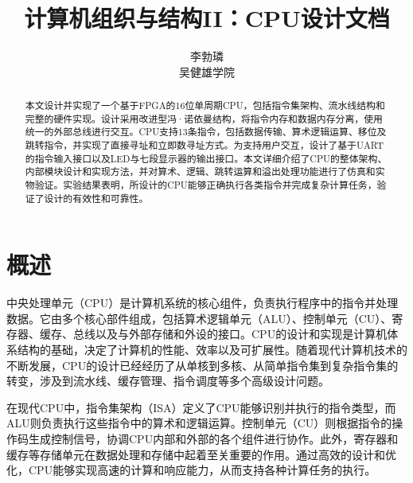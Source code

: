 \documentclass[lang=cn,a4paper,newtx]{elegantpaper}
\title{计算机组织与结构II：CPU设计文档}
\author{李勃璘 \\ 吴健雄学院}
\date{\zhdate{2025/5/6}}
\begin{document}
\maketitle
\thispagestyle{empty}
\begin{abstract}
  本文设计并实现了一个基于FPGA的16位单周期CPU，包括指令集架构、流水线结构和完整的硬件实现。设计采用改进型冯·诺依曼结构，将指令内存和数据内存分离，使用统一的外部总线进行交互。CPU支持13条指令，包括数据传输、算术逻辑运算、移位及跳转指令，并实现了直接寻址和立即数寻址方式。为支持用户交互，设计了基于UART的指令输入接口以及LED与七段显示器的输出接口。本文详细介绍了CPU的整体架构、内部模块设计和实现方法，并对算术、逻辑、跳转运算和溢出处理功能进行了仿真和实物验证。实验结果表明，所设计的CPU能够正确执行各类指令并完成复杂计算任务，验证了设计的有效性和可靠性。
\end{abstract}








\newpage
{}
\tableofcontents
\newpage
\listoftables
\newpage
{}
\section{概述}
中央处理单元（CPU）是计算机系统的核心组件，负责执行程序中的指令并处理数据。它由多个核心部件组成，包括算术逻辑单元（ALU）、控制单元（CU）、寄存器、缓存、总线以及与外部存储和外设的接口。CPU的设计和实现是计算机体系结构的基础，决定了计算机的性能、效率以及可扩展性。随着现代计算机技术的不断发展，CPU的设计已经经历了从单核到多核、从简单指令集到复杂指令集的转变，涉及到流水线、缓存管理、指令调度等多个高级设计问题。

在现代CPU中，指令集架构（ISA）定义了CPU能够识别并执行的指令类型，而ALU则负责执行这些指令中的算术和逻辑运算。控制单元（CU）则根据指令的操作码生成控制信号，协调CPU内部和外部的各个组件进行协作。此外，寄存器和缓存等存储单元在数据处理和存储中起着至关重要的作用。通过高效的设计和优化，CPU能够实现高速的计算和响应能力，从而支持各种计算任务的执行。
\end{document}
